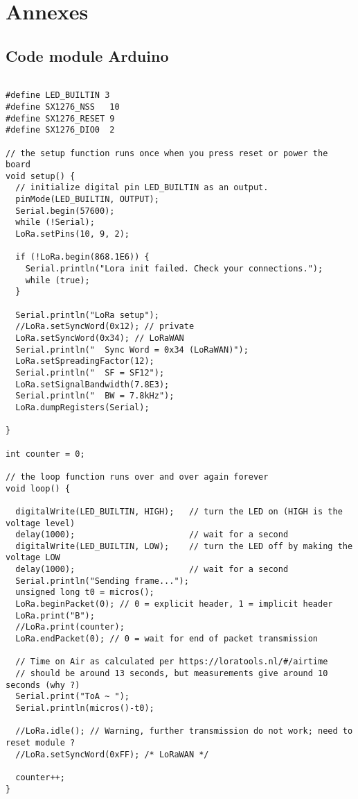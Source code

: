 \renewcommand{\leftmark}{ANNEXES}

\chapter{Annexes}

\section{Code module Arduino}\label{codearduino}

\begin{lstlisting}[style=cppstyle, caption={Module Arduino}, label={lst:cpp}]

#define LED_BUILTIN 3
#define SX1276_NSS   10
#define SX1276_RESET 9
#define SX1276_DIO0  2

// the setup function runs once when you press reset or power the board
void setup() {
  // initialize digital pin LED_BUILTIN as an output.
  pinMode(LED_BUILTIN, OUTPUT);
  Serial.begin(57600);
  while (!Serial);
  LoRa.setPins(10, 9, 2);

  if (!LoRa.begin(868.1E6)) {
    Serial.println("Lora init failed. Check your connections.");
    while (true);
  }

  Serial.println("LoRa setup");
  //LoRa.setSyncWord(0x12); // private
  LoRa.setSyncWord(0x34); // LoRaWAN
  Serial.println("  Sync Word = 0x34 (LoRaWAN)");
  LoRa.setSpreadingFactor(12);
  Serial.println("  SF = SF12");
  LoRa.setSignalBandwidth(7.8E3);
  Serial.println("  BW = 7.8kHz");
  LoRa.dumpRegisters(Serial);

}

int counter = 0;

// the loop function runs over and over again forever
void loop() {

  digitalWrite(LED_BUILTIN, HIGH);   // turn the LED on (HIGH is the voltage level)
  delay(1000);                       // wait for a second
  digitalWrite(LED_BUILTIN, LOW);    // turn the LED off by making the voltage LOW
  delay(1000);                       // wait for a second
  Serial.println("Sending frame...");
  unsigned long t0 = micros();
  LoRa.beginPacket(0); // 0 = explicit header, 1 = implicit header
  LoRa.print("B");
  //LoRa.print(counter);
  LoRa.endPacket(0); // 0 = wait for end of packet transmission

  // Time on Air as calculated per https://loratools.nl/#/airtime
  // should be around 13 seconds, but measurements give around 10 seconds (why ?)
  Serial.print("ToA ~ ");
  Serial.println(micros()-t0);

  //LoRa.idle(); // Warning, further transmission do not work; need to reset module ?
  //LoRa.setSyncWord(0xFF); /* LoRaWAN */

  counter++;
}
\end{lstlisting}

